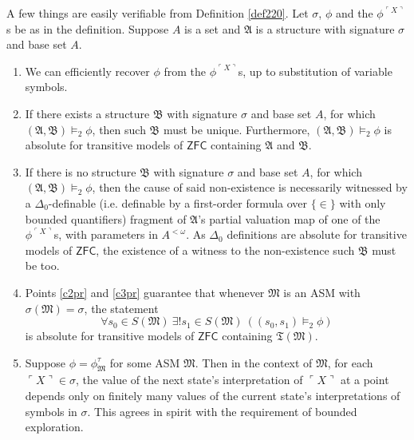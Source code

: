 \documentclass[12pt, twoside]{memoir}
\numberwithin{equation}{section}
\theoremstyle{definition}
\theoremstyle{remark}
\theoremstyle{definition}
\theoremstyle{definition}
\theoremstyle{definition}
\theoremstyle{remark}
\begin{document}
A few things are easily verifiable from Definition \ref{def220}. Let $\sigma$, $\phi$ and the $\phi^{\ulcorner X \urcorner}$s be as in the definition. Suppose $A$ is a set and $\mathfrak{A}$ is a structure with signature $\sigma$ and base set $A$.
\begin{enumerate}[label=(C\arabic*)]
    \item We can efficiently recover $\phi$ from the $\phi^{\ulcorner X \urcorner}$s, up to substitution of variable symbols.
    \item\label{c2pr} If there exists a structure $\mathfrak{B}$ with signature $\sigma$ and base set $A$, for which $(\mathfrak{A}, \mathfrak{B}) \models_2 \phi$, then such $\mathfrak{B}$ must be unique. Furthermore, $(\mathfrak{A}, \mathfrak{B}) \models_2 \phi$ is absolute for transitive models of $\mathsf{ZFC}$ containing $\mathfrak{A}$ and $\mathfrak{B}$.
    \item\label{c3pr} If there is no structure $\mathfrak{B}$ with signature $\sigma$ and base set $A$, for which $(\mathfrak{A}, \mathfrak{B}) \models_2 \phi$, then the cause of said non-existence is necessarily witnessed by a $\Delta_0$-definable (i.e. definable by a first-order formula over $\{\in\}$ with only bounded quantifiers) fragment of $\mathfrak{A}$'s partial valuation map of one of the $\phi^{\ulcorner X \urcorner}$s, with parameters in $A^{< \omega}$. As $\Delta_0$ definitions are absolute for transitive models of $\mathsf{ZFC}$, the existence of a witness to the non-existence such $\mathfrak{B}$ must be too.
    \item\label{c4pr} Points \ref{c2pr} and \ref{c3pr} guarantee that whenever $\mathfrak{M}$ is an ASM with $\sigma(\mathfrak{M}) = \sigma$, the statement
    \begin{equation*}
        \forall s_0 \in S(\mathfrak{M}) \ \exists ! s_1 \in S(\mathfrak{M}) \ ((s_0, s_1) \models_2 \phi)
    \end{equation*}
    is absolute for transitive models of $\mathsf{ZFC}$ containing $\mathfrak{T}(\mathfrak{M})$.
    \item Suppose $\phi = \phi^{\tau}_{\mathfrak{M}}$ for some ASM $\mathfrak{M}$. Then in the context of $\mathfrak{M}$, for each $\ulcorner X \urcorner \in \sigma$, the value of the next state's interpretation of $\ulcorner X \urcorner$ at a point depends only on finitely many values of the current state's interpretations of symbols in $\sigma$. This agrees in spirit with the requirement of bounded exploration.
\end{enumerate}
\end{document}
